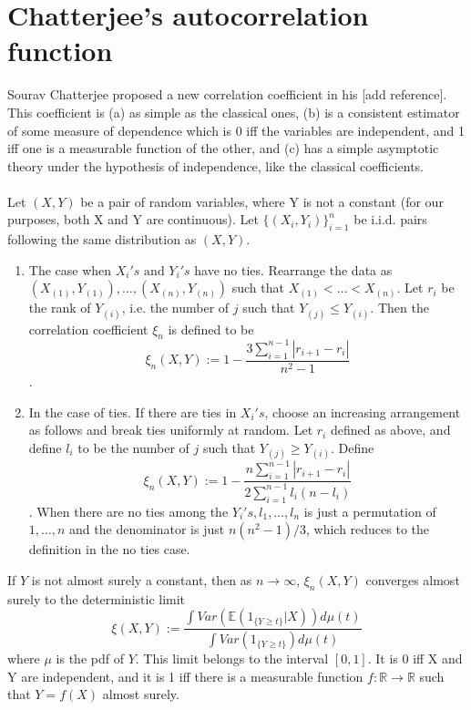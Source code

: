 \chapter{Chatterjee's autocorrelation function}

Sourav Chatterjee proposed a new correlation coefficient in his [add reference].
This coefficient is (a) as simple as the classical ones, (b) is a consistent estimator of some measure of dependence which is 0 iff the variables are independent, and 1 iff one is a measurable function of the other, and (c) has a simple asymptotic theory under the hypothesis of independence, like the classical coefficients. \\\\
Let $(X, Y)$ be a pair of random variables, where Y is not a constant (for our purposes, both X and Y are continuous). Let $\{(X_i, Y_i)\}_{i = 1}^{n}$ be i.i.d. pairs following the same distribution as $(X, Y)$.
\begin{enumerate}
    \item The case when $X_i's \text{ and } Y_i's$ have no ties. Rearrange the data as\\ $(X_{(1)}, Y_{(1)}), \dots, (X_{(n)}, Y_{(n)})$ such that $X_{(1)} < \dots < X_{(n)}$. Let $r_i$ be the rank of $Y_{(i)}$, i.e. the number of $j$ such that $Y_{(j)} \leq Y_{(i)}$.  Then the correlation coefficient $\xi_n$ is defined to be
    $$\xi_n(X, Y) := 1-\frac{3\sum_{i=1}^{n-1} |r_{i+1} - r_i|}{n^2-1}$$.

    \item In the case of ties. If there are ties in $X_i's$, choose an increasing arrangement as follows and break ties uniformly at random. Let $r_i$ defined as above, and define $l_i$ to be the number of $j$ such that $Y_{(j)} \geq Y_{(i)}$. Define
    $$\xi_n(X, Y) := 1-\frac{n\sum_{i=1}^{n-1} |r_{i+1} - r_i|}{2\sum_{i=1}^{n-1}l_i(n-l_i)}$$.
    When there are no ties among the $Y_i's, l_1, \dots, l_n$ is just a permutation of $1, \dots, n$ and the denominator is just $n(n^2-1)/3$, which reduces to the definition in the no ties case.
\end{enumerate}

\begin{theorem}
If $Y$ is not almost surely a constant, then as $n \rightarrow \infty$, $\xi_n(X, Y)$ converges almost surely to the deterministic limit
$$\xi(X, Y) := \frac{\int Var(\mathbb{E}(1_{\{Y \geq t\}}|X)) d\mu(t)}{\int Var(1_{\{Y \geq t\}}) d\mu(t)}$$
where $\mu$ is the pdf of $Y$. This limit belongs to the interval $[0, 1]$. It is 0 iff X and Y are independent, and it is 1 iff there is a measurable function $f:\mathbb{R} \rightarrow \mathbb{R}$ such that $Y = f(X)$ almost surely.
\end{theorem}